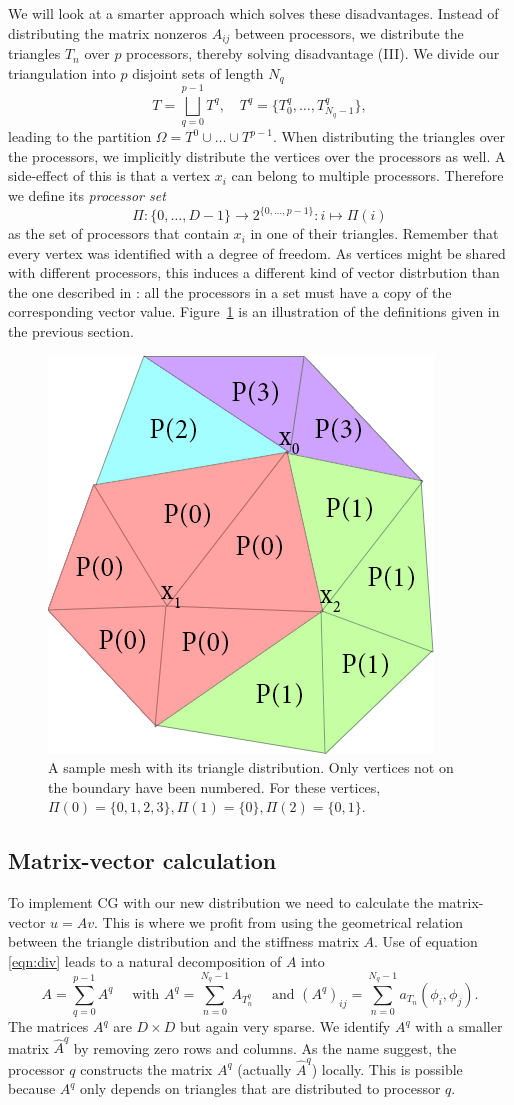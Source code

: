 \documentclass[11pt]{amsart}
\theoremstyle{definition}
\begin{document}
We will look at a smarter approach which solves these disadvantages. Instead of distributing the matrix nonzeros $A_{ij}$ between processors, we distribute the triangles $T_n$ over $p$ processors, thereby solving disadvantage (III). We divide our triangulation into $p$ disjoint sets of length $N_q$
\[
  T = \bigsqcup_{q=0}^{p-1} T^q, \quad T^q = \{ T^q_0, \ldots, T^q_{N_q-1} \},
\]
leading to the partition $\Omega = T^0 \cup \dots \cup T^{p-1}$. When distributing the triangles over the processors, we implicitly distribute the vertices over the processors as well.  A side-effect of this is that a vertex $x_i$ can belong to multiple processors. Therefore we define its \emph{processor set} 
\[
  \Pi: \{0, \ldots, D-1\} \to 2^{\{0, \ldots, p-1\}}: i \mapsto \Pi(i)
\]
as the set of processors that contain $x_i$ in one of their triangles. Remember that every vertex was identified with a degree of freedom. As vertices might be shared with different processors, this induces a different kind of vector distrbution than the one described in \cite{biss04}: all the processors in a set must have a copy of the corresponding vector value.
Figure~\ref{fig:procset} is an illustration of the definitions given in the previous section. 

\begin{figure}[h!]
  \includegraphics[width=0.5\linewidth]{procset.png}
  \caption{A sample mesh with its triangle distribution. Only vertices not on the boundary have been numbered. For these vertices, $\Pi(0) = \{0, 1, 2, 3\}, \Pi(1) = \{0\}, \Pi(2) = \{0, 1\}$.}
  \label{fig:procset}
\end{figure}
\subsection{Matrix-vector calculation}
To implement CG with our new distribution we need to calculate the matrix-vector $u = Av$. This is where we profit from using the geometrical relation between the triangle distribution and the stiffness matrix $A$. Use of equation \eqref{eqn:div} leads to a natural decomposition of $A$ into
\[
	A = \sum_{q=0}^{p-1} A^q\quad \text{ with } A^q= \sum_{n=0}^{N_q-1} A_{T^q_n} \quad \text{ and } (A^q)_{ij} = \sum_{n=0}^{N_q-1} a_{T_n}(\phi_i,\phi_j).
\]
The matrices $A^q$ are $D \times D$ but again very sparse. We identify $A^q$ with a smaller matrix $\hat A^q$ by removing zero rows and columns. As the name suggest, the processor $q$ constructs the matrix $A^q$ (actually $\hat A^q$) locally. This is possible because $A^q$ only depends on triangles that are distributed to processor $q$.
\end{document}
